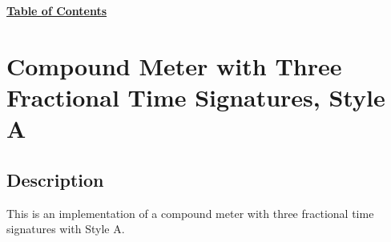 \hyperref[sec:toc]{\textbf{Table of Contents}}

\vfill \break





\section {Compound Meter with Three Fractional Time Signatures, Style A}

\hfill
{}
\hfill

\subsection{Description}
This is an implementation of a compound meter with three fractional time signatures with Style A.  


